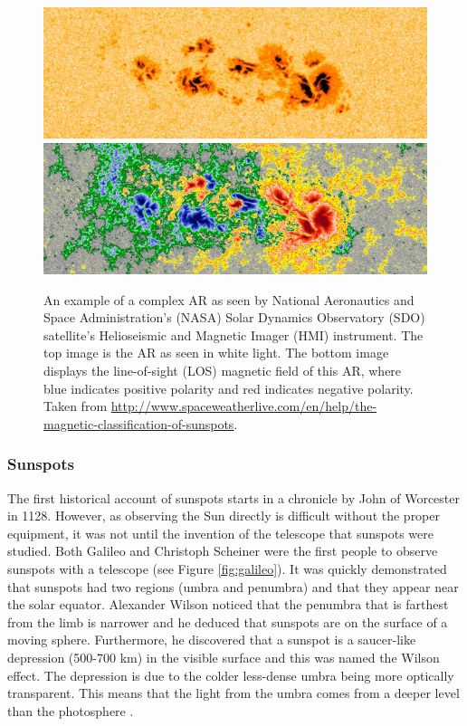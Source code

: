 	\begin{figure}
		\centering
		\includegraphics[width=\textwidth]{sunspot.jpg}\\
		\includegraphics[width=\textwidth]{sunspot_magnetic.jpg}\\
		\caption{
			     An example of a complex AR as seen by National Aeronautics and Space Administration's (NASA) Solar Dynamics Observatory (SDO) satellite's Helioseismic and Magnetic Imager (HMI) instrument.
			     The top image is the AR as seen in white light.
			     The bottom image displays the line-of-sight (LOS) magnetic field of this AR, where blue indicates positive polarity and red indicates negative polarity.
			     Taken from \url{http://www.spaceweatherlive.com/en/help/the-magnetic-classification-of-sunspots}.	
		        }
		\label{fig:AR_Mag}
	\end{figure}
		
\subsubsection{Sunspots}

	The first historical account of sunspots starts in a chronicle by John of Worcester in 1128.
	However, as observing the Sun directly is difficult without the proper equipment, it was not until the invention of the telescope that sunspots were studied.
	Both Galileo and Christoph Scheiner were the first people to observe sunspots with a telescope (see Figure \ref{fig:galileo}).
	It was quickly demonstrated that sunspots had two regions (umbra and penumbra) and that they appear near the solar equator.
    Alexander Wilson noticed that the penumbra that is farthest from the limb is narrower and he deduced that sunspots are on the surface of a moving sphere. 
    Furthermore, he discovered that a sunspot is a saucer-like depression (500-700 km) in the visible surface and this was named the Wilson effect.
    The depression is due to the colder less-dense umbra being more optically transparent.
    This means that the light from the umbra comes from a deeper level than the photosphere \citep{2014masu.book.....P}.

